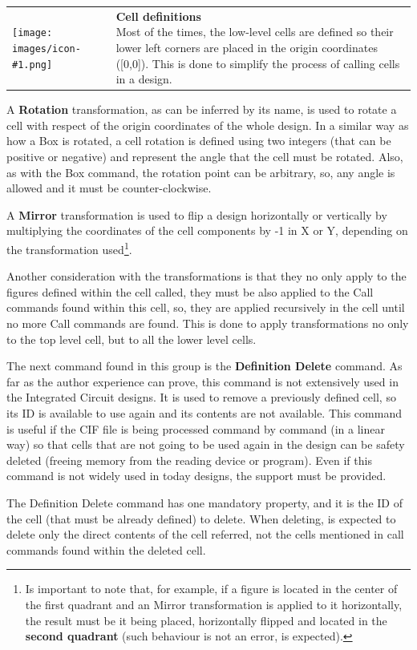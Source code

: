 \documentclass[11pt,twoside,openany,x11names,svgnames]{memoir}
\makeatletter
\newcommand{\IconNote}[3]
{
	\begin{table}[ht]
	\begin{tabular}{ lm{\dimexpr\textwidth-8\tabcolsep-\wd0}@{}}
		\toprule
		\texttt{[image: images/icon-\#1.png]}
		&
		\parbox[t]{155mm}{
		\textbf{#2} \\
		#3
		}
	\end{tabular}
\end{table}
}
\makeatother
\begin{document}
\IconNote
	{info}
	{Cell definitions}
	{Most of the times, the low-level cells are defined so their lower left corners are placed in the origin coordinates ([0,0]). This is done to simplify the process of calling cells in a design.}
	
A \textbf{Rotation} transformation, as can be inferred by its name, is used to rotate a cell with respect of the origin coordinates of the whole design. In a similar way as how a Box is rotated, a cell rotation is defined using two integers (that can be positive or negative) and represent the angle that the cell must be rotated. Also, as with the Box command, the rotation point can be arbitrary, so, any angle is allowed and it must be counter-clockwise.

A \textbf{Mirror} transformation is used to flip a design horizontally or vertically by multiplying the coordinates of the cell components by -1 in X or Y, depending on the transformation used\footnote{Is important to note that, for example, if a figure is located in the center of the first quadrant and an Mirror transformation is applied to it horizontally, the result must be it being placed, horizontally flipped and located in the \textbf{second quadrant} (such behaviour is not an error, is expected).}.

Another consideration with the transformations is that they no only apply to the figures defined within the cell called, they must be also applied to the Call commands found within this cell, so, they are applied recursively in the cell until no more Call commands are found. This is done to apply transformations no only to the top level cell, but to all the lower level cells.

The next command found in this group is the \textbf{Definition Delete} command. As far as the author experience can prove, this command is not extensively used in the Integrated Circuit designs. It is used to remove a previously defined cell, so its ID is available to use again and its contents are not available. This command is useful if the CIF file is being processed command by command (in a linear way) so that cells that are not going to be used again in the design can be safety deleted (freeing memory from the reading device or program). Even if this command is not widely used in today designs, the support must be provided.

The Definition Delete command has one mandatory property, and it is the ID of the cell (that must be already defined) to delete. When deleting, is expected to delete only the direct contents of the cell referred, not the cells mentioned in call commands found within the deleted cell.
\end{document}
